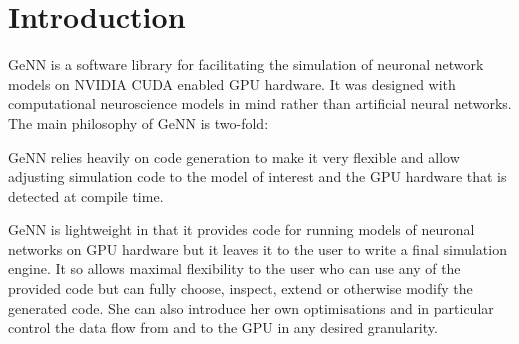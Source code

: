 \hypertarget{UserManual_sec_sIntro}{}\section{Introduction}\label{UserManual_sec_sIntro}
Ge\+N\+N is a software library for facilitating the simulation of neuronal network models on N\+V\+I\+D\+I\+A C\+U\+D\+A enabled G\+P\+U hardware. It was designed with computational neuroscience models in mind rather than artificial neural networks. The main philosophy of Ge\+N\+N is two-\/fold\+:
\begin{DoxyItemize}
\item Ge\+N\+N relies heavily on code generation to make it very flexible and allow adjusting simulation code to the model of interest and the G\+P\+U hardware that is detected at compile time.
\item Ge\+N\+N is lightweight in that it provides code for running models of neuronal networks on G\+P\+U hardware but it leaves it to the user to write a final simulation engine. It so allows maximal flexibility to the user who can use any of the provided code but can fully choose, inspect, extend or otherwise modify the generated code. She can also introduce her own optimisations and in particular control the data flow from and to the G\+P\+U in any desired granularity.
\end{DoxyItemize}

